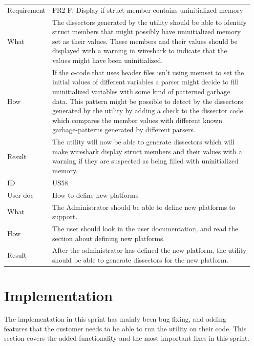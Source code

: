 \begin{table}[htbp]
{\begin{tabularx}{1.2\textwidth}{l X}
	Requirement & FR2-F: Display if struct member contains uninitialized memory \\
	What & The \glspl{dissector} generated by the \gls{utility} should be able to identify \gls{struct} \glspl{member} that might possibly have uninitialized memory set as their values.
 	These \glspl{member} and their values should be displayed with a warning in \Gls{wireshark} to indicate that the values might have been uninitialized.  \\
	How & If the \Gls{c}-code that uses \gls{header} files isn’t using memset to set the initial values of different variables a \gls{parser} might decide to fill uninitialized variables with some kind of patterned garbage data.
 	This pattern might be possible to detect by the \glspl{dissector} generated by the \gls{utility} by adding a check to the \gls{dissector} code which compares the \gls{member} values with different known garbage-patterns generated by different \glspl{parser}. \\
	Result & The \gls{utility} will now be able to generate \glspl{dissector} which will make \Gls{wireshark} display \gls{struct} \glspl{member} and their values with a warning if they are suspected as being filled with uninitialized memory. \\	
	\midrule
	ID & US58 \\
	User doc & How to define new platforms \\
	What & The Administrator should be able to define new platforms to support.  \\
	How & The user should look in the user documentation, and read the section about defining new platforms. \\
	Result & After the administrator has defined the new platform, the \gls{utility} should be able to generate \glspl{dissector} for the new platform. \\	
	\bottomrule
\end{tabularx}}
\end{table}


\section{Implementation}
\label{sec:sp4impl}
The implementation in this sprint has mainly been bug fixing, and adding 
features that the customer needs to be able to run the \gls{utility} on their code. 
This section covers the added functionality and the most important fixes
in this sprint.

